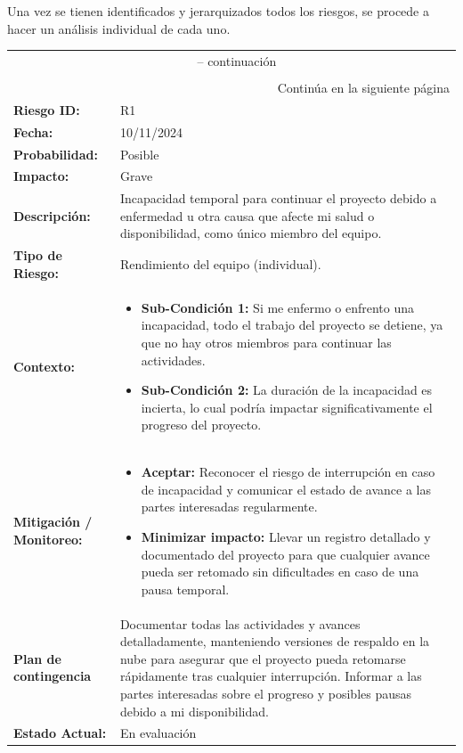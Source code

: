 Una vez se tienen identificados y jerarquizados todos los riesgos, se procede a hacer un análisis individual de cada uno.

\begin{longtable}{|m{2.5cm}|m{11cm}|}
	\hline
	\rowcolor{black!75} \multicolumn{2}{|c|}{\color{white}\textbf{Hoja de información de riesgo}} \\ 
	\hline
	\endfirsthead
	\multicolumn{2}{c}{{\tablename\ \thetable{} -- continuación}} \\
	\hline
	\rowcolor{black!75} \multicolumn{2}{|c|}{\color{white}\textbf{Hoja de información de riesgo}} \\ 
	\hline
	\endhead
	\hline \multicolumn{2}{r}{{Continúa en la siguiente página}} \\
	\endfoot
	\hline
	\endlastfoot
	
	\textbf{Riesgo ID:} & R1 \\ \hline
	\textbf{Fecha:} & 10/11/2024 \\ \hline
	\textbf{Probabilidad:} & Posible \\ \hline
	\textbf{Impacto:} & Grave \\ \hline
	\textbf{Descripción:} & Incapacidad temporal para continuar el proyecto debido a enfermedad u otra causa que afecte mi salud o disponibilidad, como único miembro del equipo. \\ \hline
	\textbf{Tipo de Riesgo:} & Rendimiento del equipo (individual). \\ \hline
	\textbf{Contexto:} & 
	\begin{itemize}
		\item \textbf{Sub-Condición 1:} Si me enfermo o enfrento una incapacidad, todo el trabajo del proyecto se detiene, ya que no hay otros miembros para continuar las actividades.
		\item \textbf{Sub-Condición 2:} La duración de la incapacidad es incierta, lo cual podría impactar significativamente el progreso del proyecto.
	\end{itemize} \\ \hline
	\textbf{Mitigación / Monitoreo:} &
	\begin{itemize}
		\item \textbf{Aceptar:} Reconocer el riesgo de interrupción en caso de incapacidad y comunicar el estado de avance a las partes interesadas regularmente.
		\item \textbf{Minimizar impacto:} Llevar un registro detallado y documentado del proyecto para que cualquier avance pueda ser retomado sin dificultades en caso de una pausa temporal.
	\end{itemize} \\ \hline
	\textbf{Plan de contingencia} & Documentar todas las actividades y avances detalladamente, manteniendo versiones de respaldo en la nube para asegurar que el proyecto pueda retomarse rápidamente tras cualquier interrupción. Informar a las partes interesadas sobre el progreso y posibles pausas debido a mi disponibilidad. \\ \hline
	\textbf{Estado Actual:} & En evaluación \\ \hline
\end{longtable}
